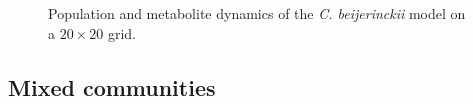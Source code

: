 \begin{figure}[h!]
{\begin{minipage}[t]{0.3\textwidth}
  \end{minipage}
  }
   \caption{Population and metabolite dynamics of the \emph{C. beijerinckii} model on a $20\times20$ grid.}
  \label{fig:beijergrids}
\end{figure}

\subsection{Mixed communities}
